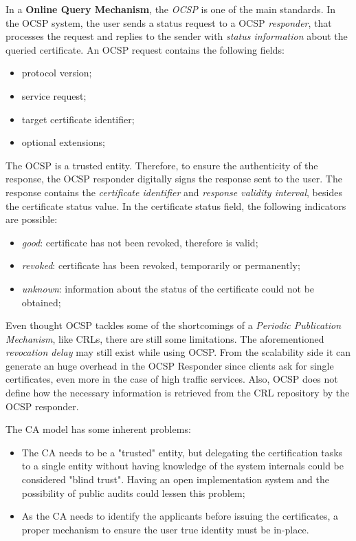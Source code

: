 In a \textbf{Online Query Mechanism}, the \textit{\ac{OCSP}}\cite{rfc6960} is one of the main standards.
In the \ac{OCSP} system, the user sends a status request to a \ac{OCSP} \textit{responder}, that processes the request and replies to the sender with \textit{status information} about the queried certificate.
An \ac{OCSP} request contains the following fields:
\begin{itemize}
	\item protocol version;
	\item service request;
	\item target certificate identifier;
	\item optional extensions;
\end{itemize}
The \ac{OCSP} is a trusted entity.
Therefore, to ensure the authenticity of the response, the \ac{OCSP} responder digitally signs the response sent to the user.
The response contains the \textit{certificate identifier} and \textit{response validity interval}, besides the certificate status value.
In the certificate status field, the following indicators are possible:
\begin{itemize}
	\item \textit{good}: certificate has not been revoked, therefore is valid;
	\item \textit{revoked}: certificate has been revoked, temporarily or permanently;
	\item \textit{unknown}: information about the status of the certificate could not be obtained;
\end{itemize}

Even thought \ac{OCSP} tackles some of the shortcomings of a \textit{Periodic Publication Mechanism}, like \acp{CRL}, there are still some limitations.
The aforementioned \textit{revocation delay} may still exist while using \ac{OCSP}.
From the scalability side it can generate an huge overhead in the \ac{OCSP} Responder since clients ask for single certificates, even more in the case of high traffic services.
Also, \ac{OCSP} does not define how the necessary information is retrieved from the \ac{CRL} repository by the \ac{OCSP} responder.

The \ac{CA} model has some inherent problems\cite{Schneier2000}:
\begin{itemize}
	\item The \ac{CA} needs to be a "trusted" entity, but delegating the certification tasks to a single entity without having knowledge of the system internals could be considered "blind trust". Having an open implementation system and the possibility of public audits could lessen this problem;
	\item As the \ac{CA} needs to identify the applicants before issuing the certificates, a proper mechanism to ensure the user true identity must be in-place.
\end{itemize}

